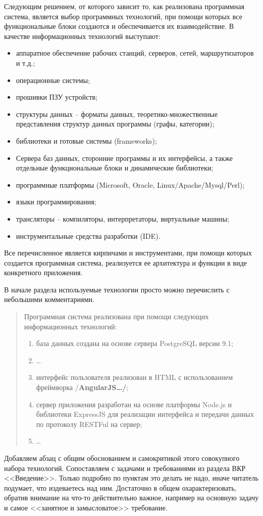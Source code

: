 \documentclass[a4paper,14pt,final]{extreport}
\newcommand{\aaa}[1]{{/\bfseries #1\ldots/}}
\begin{document}
Следующим решением, от которого зависит то, как реализована программная система, является выбор программных технологий, при помощи которых все функциональные блоки создаются и обеспечивается их взаимодействие.  В качестве информационных технологий выступают:
\begin{itemize}
\item аппаратное обеспечение рабочих станций, серверов, сетей, маршрутизаторов и т.д.;
\item операционные системы;
\item прошивки ПЗУ устройств;
\item структуры данных -- форматы данных, теоретико-множественные представления структур данных программы (графы, категории);
\item библиотеки и готовые системы (frameworks);
\item Сервера баз данных, сторонние программы и их интерфейсы, а также отдельные функциональные блоки и динамические библиотеки;
\item программные платформы (Microsoft, Oracle, Linux/Apache/Mysql/Perl);
\item языки программирования;
\item трансляторы -- компиляторы, интерпретаторы, виртуальные машины;
\item инструментальные средства разработки (IDE).
\end{itemize}
Все перечисленное является кирпичами и инструментами, при помощи которых создается программная система, реализуется ее архитектура и функции в виде конкретного приложения.

В начале раздела используемые технологии просто можно перечислить с небольшими комментариями.
\begin{quote}
  Программная система реализована при помощи следующих информационных технологий:
  \begin{enumerate}
  \item база данных создана на основе сервера PostgreSQL версии 9.1;
  \item \ldots{}
  \item интерфейс пользователя реализован в HTML с использованием фреймворка \aaa{AngularJS};
  \item сервер приложения разработан на основе платформы Node.js и библиотеки ExpressJS для реализации интерфейса и передачи данных по протоколу RESTFul на сервер;
  \item \ldots{}
  \end{enumerate}
\end{quote}
Добавляем абзац с общим обоснованием и самокритикой этого совокупного набора технологий.  Сопоставляем с задачами и требованиями из раздела ВКР <<Введение>>.  Только подробно по пунктам это делать не надо, иначе читатель подумает, что издеваетесь над ним.  Достаточно в общем охарактеризовать, обратив внимание на что-то действительно важное, например на основную задачу и самое <<занятное и замысловатое>> требование.
\end{document}
